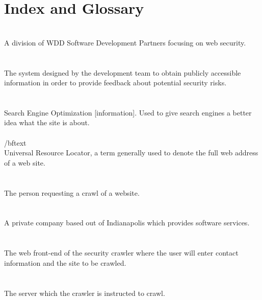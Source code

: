 \section{Index and Glossary}
\\
A division of WDD Software Development Partners focusing on web security.\\\\
\\
The system designed by the development team to obtain publicly accessible information in order to provide feedback about potential security risks.\\\\
\\
Search Engine Optimization [information].  Used to give search engines a better idea what the site is about.\\\\
/bftext{}\\
Universal Resource Locator, a term generally used to denote the full web address of a web site.\\\\
\\
The person requesting a crawl of a website.\\\\
\\
A private company based out of Indianapolis which provides software services.\\\\
\\
The web front-end of the security crawler where the user will enter contact information and the site to be crawled.\\\\
\\
The server which the crawler is instructed to crawl.
